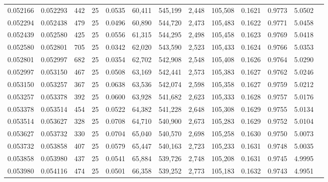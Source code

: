 \begin{tabular}{rrrrrrrrrrrrr}
0.052166 & 0.052293 &   442 &  25 &                                     0.0535 &  60,411 & 545,199 &   2,448 & 105,508 & 0.1621 & 0.9773 & 5.0502 \\
0.052294 & 0.052438 &   479 &  25 &                                     0.0496 &  60,890 & 544,720 &   2,473 & 105,483 & 0.1622 & 0.9771 & 5.0458 \\
0.052439 & 0.052580 &   425 &  25 &                                     0.0556 &  61,315 & 544,295 &   2,498 & 105,458 & 0.1623 & 0.9769 & 5.0418 \\
0.052580 & 0.052801 &   705 &  25 &                                     0.0342 &  62,020 & 543,590 &   2,523 & 105,433 & 0.1624 & 0.9766 & 5.0353 \\
0.052801 & 0.052997 &   682 &  25 &                                     0.0354 &  62,702 & 542,908 &   2,548 & 105,408 & 0.1626 & 0.9764 & 5.0290 \\
0.052997 & 0.053150 &   467 &  25 &                                     0.0508 &  63,169 & 542,441 &   2,573 & 105,383 & 0.1627 & 0.9762 & 5.0246 \\
0.053150 & 0.053257 &   367 &  25 &                                     0.0638 &  63,536 & 542,074 &   2,598 & 105,358 & 0.1627 & 0.9759 & 5.0212 \\
0.053257 & 0.053378 &   392 &  25 &                                     0.0600 &  63,928 & 541,682 &   2,623 & 105,333 & 0.1628 & 0.9757 & 5.0176 \\
0.053378 & 0.053514 &   454 &  25 &                                     0.0522 &  64,382 & 541,228 &   2,648 & 105,308 & 0.1629 & 0.9755 & 5.0134 \\
0.053514 & 0.053627 &   328 &  25 &                                     0.0708 &  64,710 & 540,900 &   2,673 & 105,283 & 0.1629 & 0.9752 & 5.0104 \\
0.053627 & 0.053732 &   330 &  25 &                                     0.0704 &  65,040 & 540,570 &   2,698 & 105,258 & 0.1630 & 0.9750 & 5.0073 \\
0.053732 & 0.053858 &   407 &  25 &                                     0.0579 &  65,447 & 540,163 &   2,723 & 105,233 & 0.1631 & 0.9748 & 5.0035 \\
0.053858 & 0.053980 &   437 &  25 &                                     0.0541 &  65,884 & 539,726 &   2,748 & 105,208 & 0.1631 & 0.9745 & 4.9995 \\
0.053980 & 0.054116 &   474 &  25 &                                     0.0501 &  66,358 & 539,252 &   2,773 & 105,183 & 0.1632 & 0.9743 & 4.9951 \\

\end{tabular}
